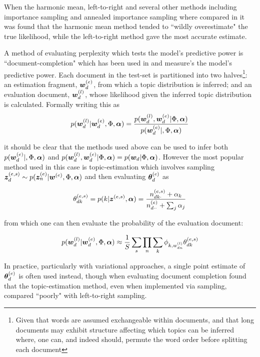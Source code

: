 When the harmonic mean, left-to-right and several other methods including importance sampling and annealed importance sampling where compared in \cite{Wallach2009} it was found that the harmonic mean method tended to ``wildly overestimate" the true likelihood, while the left-to-right method gave the most accurate estimate.

A method of evaluating perplexity which tests the model's predictive power is ``document-completion" which has been used in \cite{Virtanen2012a}\cite{Asuncion2012}\cite{RosenZvi2004} and measure's the model's predictive power. Each document in the test-set is partitioned into two halves\footnote{Given that words are assumed exchangeable within documents, and that long documents may exhibit structure affecting which topics can be inferred where, one can, and indeed should, permute the word order before splitting each document}: an estimation fragment, $\bm w_d^{(e)}$, from which a topic distribution is inferred; and an evaluation document, $\bm w_d^{(l)}$, whose likelihood given the inferred topic distribution is calculated. Formally writing this as
\begin{align}
p(\bm w_d^{(l)}|\bm w_d^{(e)}, \Phi, \bm \alpha) = \frac{p(\bm w_d^{(l)},\bm w_d^{(e)} |\Phi, \bm \alpha)}{p(\bm w_d^{(e)}|, \Phi, \bm \alpha)}
\end{align}

it should be clear that the methods used above can be used to infer both $p(\bm w_d^{(e)}|, \Phi, \bm \alpha)$ and $p(\bm w_d^{(l)},\bm w_d^{(e)} | \Phi, \bm \alpha) = p(\bm w_d | \Phi, \bm \alpha)$. However the most  popular method used in this case is topic-estimation which involves sampling $\bm z_d^{(e,s)} \sim p(\bm z_n^{(e)} | \bm w^{(e)}, \Phi, \bm \alpha)$ and then evaluating $\bm \theta_d^{(e)}$ as

\begin{align}
\theta^{(e,s)}_{dk} = p(k | \bm z^{(e,s)}, \bm \alpha) = \frac{n^{(e,s)}_{dk\cdot} + \alpha_k}{n^{(e)}_{d\cdot\cdot} + \sum_j \alpha_j}
\end{align}

from which one can then evaluate the probability of the evaluation document:

\begin{align}
p(\bm w_d^{(l)}|\bm w_d^{(e)}, \Phi, \bm \alpha) \approx
\frac{1}{ {S} } \sum_s \prod_n \sum_k \phi_{k,w^{(l)}_{dn}}\theta_{dk}^{(e,s)}
\end{align}

In practice, particularly with variational approaches, a single point estimate of $\bm \theta_d^{(e)}$ is often used instead\cite{Asuncion2012}, though when evaluating document completion \cite{Wallach2009} found that the topic-estimation method, even when implemented via sampling, compared ``poorly" with left-to-right sampling. 

